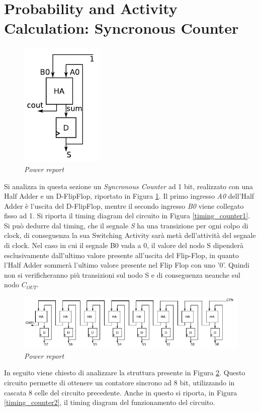 \section{Probability and Activity Calculation: Syncronous Counter}
\begin{figure}[!htb]
	\centering
	\includegraphics[scale=0.6]{immagini/counter}
	\caption{\textit{Power report}}
	\label{counter}
\end{figure}
\noindent Si analizza in questa sezione un \textit{Syncronous Counter} ad 1 bit, realizzato con una Half Adder e un D-FlipFlop, riportato in Figura \ref{counter}. Il primo ingresso \textit{A0} dell'Half Adder è l'uscita del D-FlipFlop, mentre il secondo ingresso \textit{B0} viene collegato fisso ad 1. Si riporta il timing diagram del circuito in Figura \ref{timing_counter1}.
Si può dedurre dal timing, che il segnale \textit{S} ha una transizione per ogni colpo di clock, di conseguenza la sua Switching Activity sarà metà dell'attività del segnale di clock. Nel caso in cui il segnale B0 vada a 0, il valore del nodo S dipenderà esclusivamente dall'ultimo valore presente all'uscita del Flip-Flop, in quanto l'Half Adder sommerà l'ultimo valore presente nel Flip Flop con uno '0'. Quindi non si verificheranno più transizioni sul nodo S e di conseguenza neanche sul nodo $C_{OUT}$.
\begin{figure}[!htb]
	\centering
	\includegraphics[scale=0.6]{immagini/counter2}
	\caption{\textit{Power report}}
	\label{counter2}
\end{figure}
In seguito viene chiesto di analizzare la struttura presente in Figura \ref{counter2}. Questo circuito permette di ottenere un contatore sincrono ad 8 bit, utilizzando in cascata 8 celle del circuito precedente. Anche in questo si riporta, in Figura \ref{timing_counter2}, il timing diagram del funzionamento del circuito.
